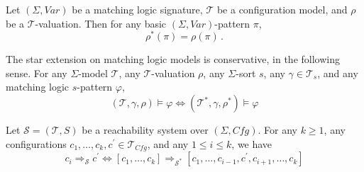 \documentclass{article}
\newcommand{\Tcfg}{\mathcal{T}_{\mathit{Cfg}}}
\begin{document}
\begin{lemma}\label{lem:rhoStarOfPi}
    Let $(\Sigma, \mathit{Var})$ be a matching logic signature, $\mathcal{T}$ be a configuration model,
    and $\rho$ be a $\mathcal{T}$-valuation. Then for any basic $(\Sigma, \mathit{Var})$-pattern $\pi$,
    \begin{equation}
        \rho^*(\pi) = \rho(\pi) \, .
    \end{equation}
\end{lemma}

\begin{lemma}\label{lem:starConservative}
    The star extension on matching logic models is conservative, in the following sense.
    For any $\Sigma$-model $\mathcal{T}$, any $\mathcal{T}$-valuation $\rho$,
    any $\Sigma$-sort $s$,
    any $\gamma \in \mathcal{T}_s$,
    and any matching logic $s$-pattern $\varphi$,
    \begin{equation*}
        (\mathcal{T}, \gamma, \rho) \vDash \varphi \iff (\mathcal{T}^*, \gamma, \rho^*) \vDash \varphi
    \end{equation*}
\end{lemma}

\begin{lemma}\label{lem:compositeStep}
    Let $\mathcal{S} = (\mathcal{T}, S)$ be a reachability system over $(\Sigma, \mathit{Cfg})$.
    For any $k \geq 1$, any configurations $c_1,\ldots,c_k, c^\prime \in \Tcfg$, and any $1 \leq i \leq k$,
    we have
    \begin{equation*}
        c_i \Rightarrow_{\mathcal{S}} c^\prime
                    \iff
        [c_1,\ldots,c_k] \Rightarrow_{\mathcal{S}^*} [c_1, \ldots, c_{i-1}, c^\prime, c_{i+1}, \ldots, c_k]
    \end{equation*}
\end{lemma}
\end{document}

